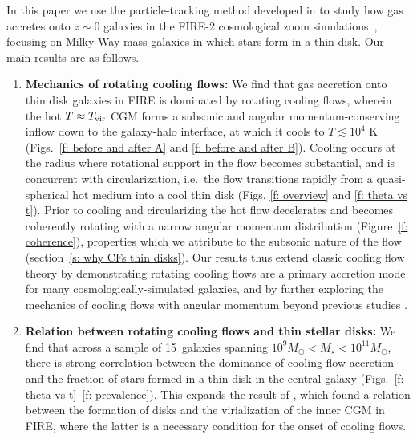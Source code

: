 \documentclass[fleqn,usenatbib]{mnras}
\newcommand{\Nsample}{15}
\begin{document}
In this paper we use the particle-tracking method developed in \cite{Hafen2019,Hafen2020} to study how gas accretes onto $z\sim0$ galaxies in the FIRE-2 cosmological zoom simulations~\citep{Hopkins2018b}, focusing on Milky-Way mass galaxies in which stars form in a thin disk. 
Our main results are as follows.
\begin{enumerate}
    \item \textbf{Mechanics of rotating cooling flows:}
    We find that gas accretion onto thin disk galaxies in FIRE is dominated by rotating cooling flows, wherein the hot $T\approx T_{\rm vir}$ CGM forms a subsonic and angular momentum-conserving inflow down to the galaxy-halo interface, at which it cools to $T\lesssim10^4$ K (Figs.~\ref{f: before and after A} and \ref{f: before and after B}).
    Cooling occurs at the radius where rotational support in the flow becomes substantial, and is concurrent with circularization, i.e.~the flow transitions rapidly from a quasi-spherical hot medium into a cool thin disk (Figs. \ref{f: overview} and \ref{f: theta vs t}).
    Prior to cooling and circularizing the hot flow decelerates and becomes coherently rotating with a narrow angular momentum distribution (Figure~\ref{f: coherence}), properties which we attribute to the subsonic nature of the flow (section~\ref{s: why CFs thin disks}).
    Our results thus extend classic cooling flow theory by demonstrating rotating cooling flows are a primary accretion mode for many cosmologically-simulated galaxies, and by further exploring the mechanics of cooling flows with angular momentum beyond previous studies \citep{Cowie1980, Stern2019}. 
    \item \textbf{Relation between rotating cooling flows and thin stellar disks:}
    We find that across a sample of \Nsample~galaxies spanning $10^9 M_\odot < M_\star < 10^{11} M_\odot$, there is strong correlation between the dominance of cooling flow accretion and the fraction of stars formed in a thin disk in the central galaxy (Figs.~\ref{f: theta vs t}--\ref{f: prevalence}).
    This expands the result of \cite{Stern2021}, which found a relation between the formation of disks and the virialization of the inner CGM in FIRE, where the latter is a necessary condition for the onset of cooling flows. 

\end{enumerate}
\end{document}
